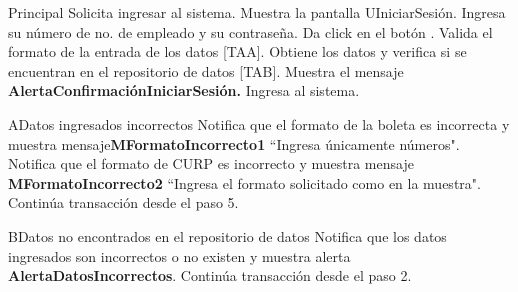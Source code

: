 \begin{UCtrayectoria}{Principal}
  \UCpaso[\UCactor] Solicita ingresar al sistema.
  \UCpaso Muestra la pantalla UIniciarSesión.
  \UCpaso[\UCactor] Ingresa su número de no. de empleado y su contraseña.
  \UCpaso[\UCactor]Da click en el botón .
  \UCpaso Valida el formato de la entrada de los datos [TAA].
  \UCpaso Obtiene los datos y verifica si se encuentran en el repositorio de datos [TAB].
  \UCpaso Muestra el mensaje {\bf AlertaConfirmaciónIniciarSesión. }
  \UCpaso[\UCactor]Ingresa al sistema.
\end{UCtrayectoria}


\begin{UCtrayectoriaA}{A}{Datos ingresados incorrectos}
  \UCpaso Notifica que el formato de la boleta es incorrecta y muestra mensaje{\bf MFormatoIncorrecto1} ``Ingresa únicamente números".
  \UCpaso Notifica que el formato de CURP es incorrecto y muestra mensaje {\bf MFormatoIncorrecto2} ``Ingresa el formato solicitado como en la muestra".
  \UCpaso Continúa transacción desde el paso 5.
\end{UCtrayectoriaA}

\begin{UCtrayectoriaA}{B}{Datos no encontrados en el repositorio de datos}
  \UCpaso Notifica que los datos ingresados son incorrectos o no existen y muestra alerta {\bf AlertaDatosIncorrectos}.
  \UCpaso Continúa transacción desde el paso 2.
\end{UCtrayectoriaA}
